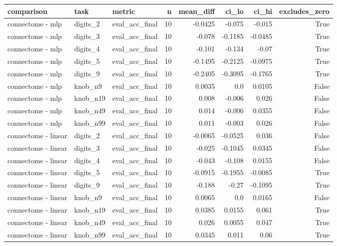 \begin{table}[t]
\centering
\small
\begin{tabular}{lllrrrrr}
\toprule
comparison & task & metric & n & mean\_diff & ci\_lo & ci\_hi & excludes\_zero \\
\midrule
connectome - mlp & digits\_2 & eval\_acc\_final & 10 & -0.0425 & -0.075 & -0.015 & True \\
connectome - mlp & digits\_3 & eval\_acc\_final & 10 & -0.078 & -0.1185 & -0.0485 & True \\
connectome - mlp & digits\_4 & eval\_acc\_final & 10 & -0.101 & -0.134 & -0.07 & True \\
connectome - mlp & digits\_5 & eval\_acc\_final & 10 & -0.1495 & -0.2125 & -0.0975 & True \\
connectome - mlp & digits\_9 & eval\_acc\_final & 10 & -0.2405 & -0.3095 & -0.1765 & True \\
connectome - mlp & knob\_n9 & eval\_acc\_final & 10 & 0.0035 & 0.0 & 0.0105 & False \\
connectome - mlp & knob\_n19 & eval\_acc\_final & 10 & 0.008 & -0.006 & 0.026 & False \\
connectome - mlp & knob\_n49 & eval\_acc\_final & 10 & 0.014 & -0.006 & 0.0355 & False \\
connectome - mlp & knob\_n99 & eval\_acc\_final & 10 & 0.011 & -0.003 & 0.026 & False \\
connectome - linear & digits\_2 & eval\_acc\_final & 10 & -0.0065 & -0.0525 & 0.036 & False \\
connectome - linear & digits\_3 & eval\_acc\_final & 10 & -0.025 & -0.1045 & 0.0345 & False \\
connectome - linear & digits\_4 & eval\_acc\_final & 10 & -0.043 & -0.108 & 0.0155 & False \\
connectome - linear & digits\_5 & eval\_acc\_final & 10 & -0.0915 & -0.1955 & -0.0085 & True \\
connectome - linear & digits\_9 & eval\_acc\_final & 10 & -0.188 & -0.27 & -0.1095 & True \\
connectome - linear & knob\_n9 & eval\_acc\_final & 10 & 0.0065 & 0.0 & 0.0165 & False \\
connectome - linear & knob\_n19 & eval\_acc\_final & 10 & 0.0385 & 0.0155 & 0.061 & True \\
connectome - linear & knob\_n49 & eval\_acc\_final & 10 & 0.026 & 0.0055 & 0.047 & True \\
connectome - linear & knob\_n99 & eval\_acc\_final & 10 & 0.0345 & 0.011 & 0.06 & True \\

\end{tabular}
\end{table}
